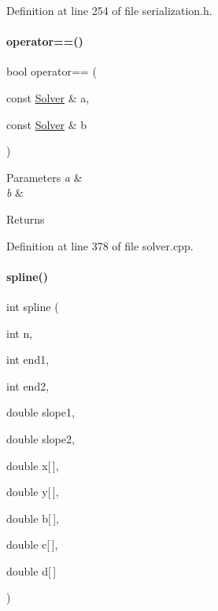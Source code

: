 Definition at line 254 of file serialization.\+h.

\mbox{\label{namespaceamici_a252a116a8f94abccc25b2086deb0734b}} 
\paragraph{\texorpdfstring{operator==()}{operator==()}\hspace{0.1cm}{\footnotesize\ttfamily [2/2]}}
{\footnotesize\ttfamily bool operator== (\begin{DoxyParamCaption}\item[{const \mbox{\hyperlink{classamici_1_1_solver}{Solver}} \&}]{a,  }\item[{const \mbox{\hyperlink{classamici_1_1_solver}{Solver}} \&}]{b }\end{DoxyParamCaption})}


\begin{DoxyParams}{Parameters}
{\em a} & \\
\hline
{\em b} & \\
\hline
\end{DoxyParams}
\begin{DoxyReturn}{Returns}

\end{DoxyReturn}


Definition at line 378 of file solver.\+cpp.

\mbox{\label{namespaceamici_aa6801bbdb0c7625719c019ac287be29e}} 
\paragraph{\texorpdfstring{spline()}{spline()}\hspace{0.1cm}{\footnotesize\ttfamily [1/2]}}
{\footnotesize\ttfamily int spline (\begin{DoxyParamCaption}\item[{int}]{n,  }\item[{int}]{end1,  }\item[{int}]{end2,  }\item[{double}]{slope1,  }\item[{double}]{slope2,  }\item[{double}]{x\mbox{[}$\,$\mbox{]},  }\item[{double}]{y\mbox{[}$\,$\mbox{]},  }\item[{double}]{b\mbox{[}$\,$\mbox{]},  }\item[{double}]{c\mbox{[}$\,$\mbox{]},  }\item[{double}]{d\mbox{[}$\,$\mbox{]} }\end{DoxyParamCaption})}

